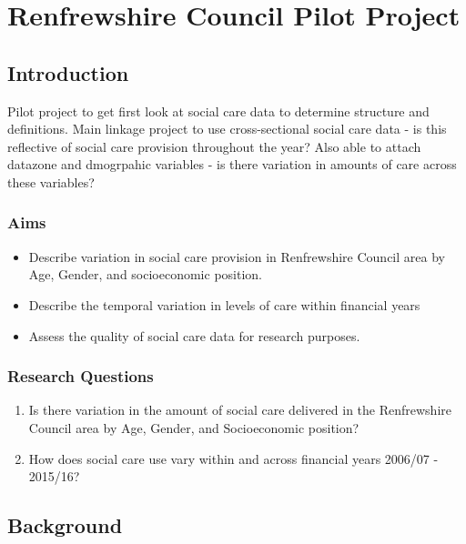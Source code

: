 \documentclass[12pt,]{report}
\providecommand{\tightlist}{%
  \setlength{\itemsep}{0pt}\setlength{\parskip}{0pt}}
\begin{document}
\FloatBarrier
\newpage
{}

\chapter{Renfrewshire Council Pilot Project}\label{ch:renfrew}

\section{Introduction}\label{sec:renf-intro}

Pilot project to get first look at social care data to determine
structure and definitions. Main linkage project to use cross-sectional
social care data - is this reflective of social care provision
throughout the year? Also able to attach datazone and dmogrpahic
variables - is there variation in amounts of care across these
variables?

\subsection{Aims}\label{subsec:renfrew-aims}

\begin{itemize}
\tightlist
\item
  Describe variation in social care provision in Renfrewshire Council
  area by Age, Gender, and socioeconomic position.
\item
  Describe the temporal variation in levels of care within financial
  years
\item
  Assess the quality of social care data for research purposes.
\end{itemize}

\subsection{Research Questions}\label{subsec:renfrew-qs}

\begin{enumerate}[noitemsep]
\item Is there variation in the amount of social care delivered in the Renfrewshire Council area by Age, Gender, and Socioeconomic position?
\item How does social care use vary within and across financial years 2006/07 - 2015/16?
\end{enumerate}

\section{Background}\label{sec:renf-back}
\end{document}

